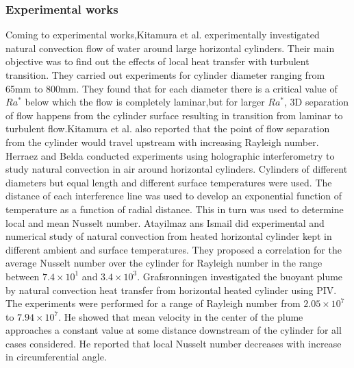 \subsubsection{Experimental works}       
\hspace{1cm}Coming to experimental works,Kitamura et al.\cite{kitamura} experimentally investigated natural convection flow of water around large horizontal cylinders. Their main objective was to find out the effects of local heat transfer with turbulent transition. They carried out experiments for cylinder diameter ranging from 65mm to 800mm. They found that for each diameter there is a critical value of $Ra^{*}$ below which the flow is completely laminar,but for larger $Ra^{*}$, 3D separation of flow happens from the cylinder surface resulting in transition from laminar to turbulent flow.Kitamura et al. also reported that the point of flow separation from the cylinder would travel upstream with increasing Rayleigh number. Herraez and Belda\cite{hez} conducted experiments using holographic interferometry to study natural convection in air around horizontal cylinders. Cylinders of different diameters but equal length and different surface temperatures were used. The distance of each interference line was used to develop an exponential function of temperature as a function of radial distance. This in turn was used to determine local and mean Nusselt number. Atayilmaz ans Ismail\cite{ata} did experimental and numerical study of natural convection from heated horizontal cylinder kept in different ambient and surface temperatures. They proposed a correlation for the average Nusselt number over the cylinder for Rayleigh number in the range between $7.4\times10^1$ and $3.4\times10^3$. Grafsronningen investigated the buoyant plume by natural convection heat transfer from horizontal heated cylinder using PIV. The experiments were performed for a range of Rayleigh number from $2.05\times10^{7}$ to $7.94 \times10^{7}$. He showed that mean velocity in the center of the plume approaches a constant value at some distance downstream of the cylinder for all cases considered. He reported that local Nusselt number decreases with increase in circumferential angle.	

